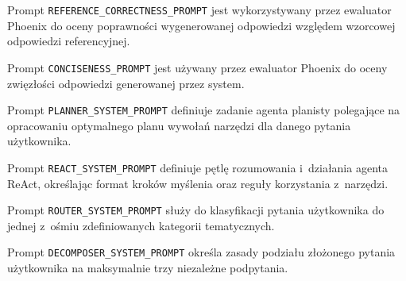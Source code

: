 

Prompt \texttt{REFERENCE\_CORRECTNESS\_PROMPT} jest wykorzystywany przez
ewaluator Phoenix do oceny poprawności wygenerowanej odpowiedzi względem
wzorcowej odpowiedzi referencyjnej.



Prompt \texttt{CONCISENESS\_PROMPT} jest używany przez ewaluator Phoenix do
oceny zwięzłości odpowiedzi generowanej przez system.



Prompt \texttt{PLANNER\_SYSTEM\_PROMPT} definiuje zadanie agenta planisty
polegające na opracowaniu optymalnego planu wywołań narzędzi dla danego pytania
użytkownika.



Prompt \texttt{REACT\_SYSTEM\_PROMPT} definiuje pętlę rozumowania i~działania
agenta ReAct, określając format kroków myślenia oraz reguły korzystania
z~narzędzi.



Prompt \texttt{ROUTER\_SYSTEM\_PROMPT} służy do klasyfikacji pytania
użytkownika do jednej z~ośmiu zdefiniowanych kategorii tematycznych.



Prompt \texttt{DECOMPOSER\_SYSTEM\_PROMPT} określa zasady podziału złożonego
pytania użytkownika na maksymalnie trzy niezależne podpytania.

